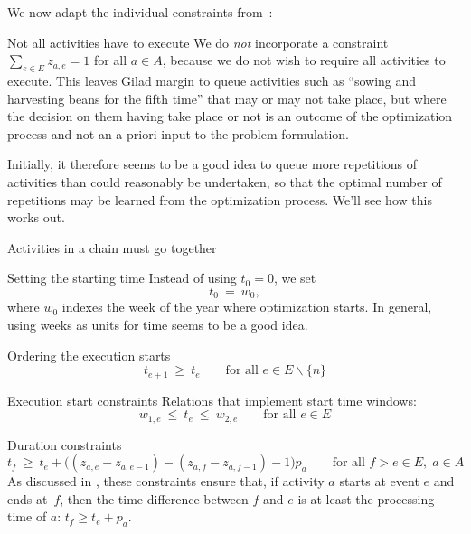 \documentclass[11pt,reqno]{amsart}
\numberwithin{equation}{section}
\newcommand{\ojo}[1]{\textsf{\bfseries\boldmath{#1}}}
\begin{document}
We now adapt the individual constraints from~\cite{artigues-etal11}:

\begin{mydesc}

\item[Not all activities have to execute] We do \emph{not} incorporate a constraint
  $\sum_{e\in E} z_{a,e}=1$ for all $a\in A$, because we do not wish to require all
  activities to execute. This leaves Gilad margin to queue activities such as ``sowing and
  harvesting beans for the fifth time'' that may or may not take place, but where the
  decision on them having take place or not is an outcome of the optimization process and
  not an a-priori input to the problem formulation.

  Initially, it therefore seems to be a good idea to queue more repetitions of activities
  than could reasonably be undertaken, so that the optimal number of repetitions may be
  learned from the optimization process. We'll see how this works out.

\item[Activities in a chain must go together] \ojo{implement me}

\item[Setting the starting time] Instead of using $t_0=0$, we set
  \begin{equation}
     t_0
     \ = \
     w_0,
  \end{equation}
  where $w_0$ indexes the week of the year where optimization starts. In general, using
  weeks as units for time seems to be a good idea.

\item[Ordering the execution starts]
  \begin{equation}
     t_{e+1} 
     \ \ge \
     t_e
     \qquad\text{for all }
      e\in E\smallsetminus\{n\}
  \end{equation}

\item[Execution start constraints] Relations that implement start time windows:
  \begin{equation}
    w_{1,e}\ \le\ t_e \ \le \ w_{2,e}
    \qquad\text{for all } e\in E
  \end{equation}
  

\item[Duration constraints]
  \begin{equation}
     t_f 
     \ \ge \
     t_e + \big((z_{a,e} - z_{a,e-1} ) - (z_{a,f} - z_{a,f-1}) - 1\big) p_a
     \qquad\text{for all } f>e\in E,\; a\in A
  \end{equation}
  As discussed in \cite{artigues-etal11}, these constraints ensure that,
if activity $a$ starts at event $e$ and ends at~$f$, then the time difference between  $f$
and $e$ is at least the processing time of $a$: $t_f \ge t_e + p_a$.


\end{mydesc}
\end{document}
